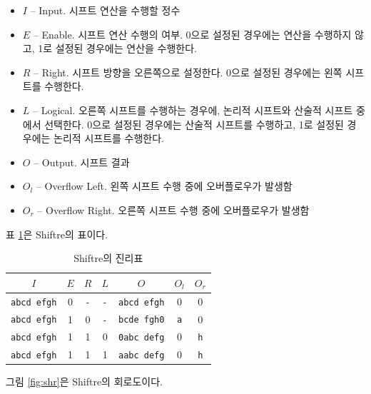 \documentclass{article}
\renewcommand{\figurename}{그림}
\renewcommand{\tablename}{표}
\begin{document}
\begin{itemize}
    \item $I$ -- Input. 시프트 연산을 수행할 정수
    \item $E$ -- Enable. 시프트 연산 수행의 여부.
        0으로 설정된 경우에는 연산을 수행하지 않고,
        1로 설정된 경우에는 연산을 수행한다.
    \item $R$ -- Right. 시프트 방향을 오른쪽으로 설정한다.
        0으로 설정된 경우에는 왼쪽 시프트를 수행한다.
    \item $L$ -- Logical. 오른쪽 시프트를 수행하는 경우에,
        논리적 시프트와 산술적 시프트 중에서 선택한다.
        0으로 설정된 경우에는 산술적 시프트를 수행하고,
        1로 설정된 경우에는 논리적 시프트를 수행한다.
    \item $O$ -- Output. 시프트 결과
    \item $O_l$ -- Overflow Left. 왼쪽 시프트 수행 중에 오버플로우가 발생함
    \item $O_r$ -- Overflow Right. 오른쪽 시프트 수행 중에 오버플로우가 발생함
\end{itemize}

\tablename{} \ref{tab:shr}은 Shiftre의 표이다.

\begin{table}[h]
    \centering
    \begin{tabular}{c|ccc|ccc}
        $I$ & $E$ & $R$ & $L$ & $O$ & $O_l$ & $O_r$ \\
        \hline
        \texttt{abcd efgh} & 0 & - & - & \texttt{abcd efgh} & 0 & 0 \\
        \texttt{abcd efgh} & 1 & 0 & - & \texttt{bcde fgh0} & \texttt a & 0 \\
        \texttt{abcd efgh} & 1 & 1 & 0 & \texttt{0abc defg} & 0 & \texttt h \\
        \texttt{abcd efgh} & 1 & 1 & 1 & \texttt{aabc defg} & 0 & \texttt h \\
    \end{tabular}
    \caption{Shiftre의 진리표}
    \label{tab:shr}
\end{table}

\figurename{} \ref{fig:shr}은 Shiftre의 회로도이다.
\end{document}
